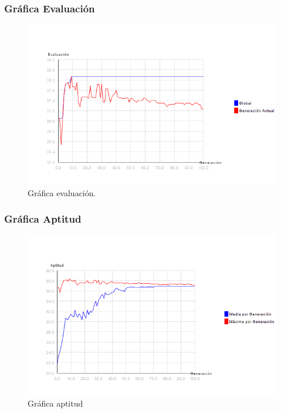 \documentclass[12pt]{article}
\begin{document}
\subsubsection*{Gráfica Evaluación}
\begin{figure}[H]
\centering
\includegraphics[scale=0.5]{graficas/F2inicial_algoritmo}
\caption{Gráfica evaluación.}
\label{fig}
\end{figure}

\subsubsection*{Gráfica Aptitud}
\begin{figure}[H]
\centering
\includegraphics[scale=0.5]{graficas/F2inicial_aptitud}
\caption{Gráfica aptitud}
\label{fig}
\end{figure}
\end{document}
